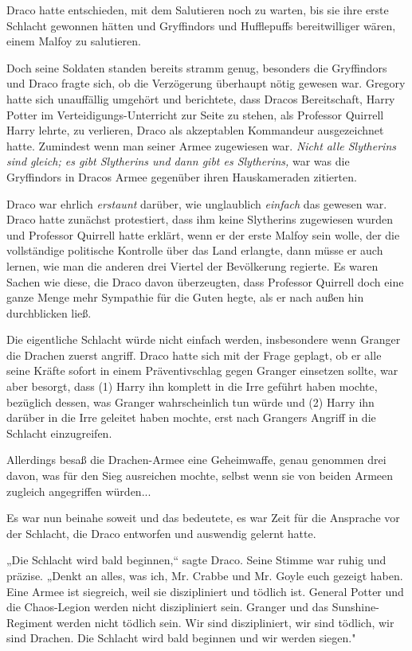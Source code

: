 {Draco hatte entschieden, mit dem Salutieren noch zu warten, bis sie ihre erste Schlacht gewonnen hätten und Gryffindors und Hufflepuffs bereitwilliger wären, einem Malfoy zu salutieren.

Doch seine Soldaten standen bereits stramm genug, besonders die Gryffindors und Draco fragte sich, ob die Verzögerung überhaupt nötig gewesen war. Gregory hatte sich unauffällig umgehört und berichtete, dass Dracos Bereitschaft, Harry Potter im Verteidigungs-Unterricht zur Seite zu stehen, als Professor Quirrell Harry lehrte, zu verlieren, Draco als akzeptablen Kommandeur ausgezeichnet hatte. Zumindest wenn man seiner Armee zugewiesen war. \emph{Nicht alle Slytherins sind gleich; es gibt Slytherins und dann gibt es Slytherins,} war was die Gryffindors in Dracos Armee gegenüber ihren Hauskameraden zitierten.

Draco war ehrlich \emph{erstaunt} darüber, wie unglaublich \emph{einfach} das gewesen war. Draco hatte zunächst protestiert, dass ihm keine Slytherins zugewiesen wurden und Professor Quirrell hatte erklärt, wenn er der erste Malfoy sein wolle, der die vollständige politische Kontrolle über das Land erlangte, dann müsse er auch lernen, wie man die anderen drei Viertel der Bevölkerung regierte. Es waren Sachen wie diese, die Draco davon überzeugten, dass Professor Quirrell doch eine ganze Menge mehr Sympathie für die Guten hegte, als er nach außen hin durchblicken ließ.

Die eigentliche Schlacht würde nicht einfach werden, insbesondere wenn Granger die Drachen zuerst angriff. Draco hatte sich mit der Frage geplagt, ob er alle seine Kräfte sofort in einem Präventivschlag gegen Granger einsetzen sollte, war aber besorgt, dass (1) Harry ihn komplett in die Irre geführt haben mochte, bezüglich dessen, was Granger wahrscheinlich tun würde und (2) Harry ihn darüber in die Irre geleitet haben mochte, erst nach Grangers Angriff in die Schlacht einzugreifen.

Allerdings besaß die Drachen-Armee eine Geheimwaffe, genau genommen drei davon, was für den Sieg ausreichen mochte, selbst wenn sie von beiden Armeen zugleich angegriffen würden...

Es war nun beinahe soweit und das bedeutete, es war Zeit für die Ansprache vor der Schlacht, die Draco entworfen und auswendig gelernt hatte.

„Die Schlacht wird bald beginnen,“ sagte Draco. Seine Stimme war ruhig und präzise. „Denkt an alles, was ich, Mr. Crabbe und Mr. Goyle euch gezeigt haben. Eine Armee ist siegreich, weil sie diszipliniert und tödlich ist. General Potter und die Chaos-Legion werden nicht diszipliniert sein. Granger und das Sunshine-Regiment werden nicht tödlich sein. Wir sind diszipliniert, wir sind tödlich, wir sind Drachen. Die Schlacht wird bald beginnen und wir werden siegen."

}
